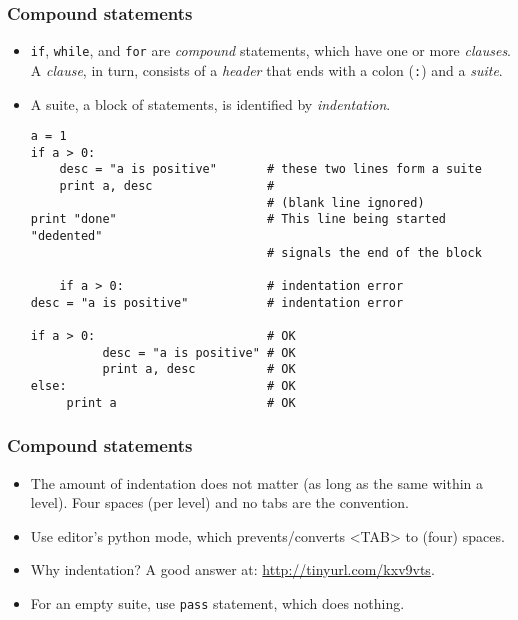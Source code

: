 \documentclass{beamer}
\begin{document}
\begin{frame}[fragile]
\frametitle{Compound statements}
\begin{itemize}
\item \lstinline{if}, \lstinline{while}, and \lstinline{for}
      are \emph{compound} statements, which have
      one or more \emph{clauses}. A \emph{clause}, in turn,
      consists of a \emph{header}
      that ends with a colon (\lstinline{:}) and 
      a \emph{suite}.
\item A suite, a block of statements, is identified by \emph{indentation}.
\begin{lstlisting}
a = 1
if a > 0:
    desc = "a is positive"       # these two lines form a suite 
    print a, desc                #
                                 # (blank line ignored)
print "done"                     # This line being started "dedented"
                                 # signals the end of the block

    if a > 0:                    # indentation error
desc = "a is positive"           # indentation error

if a > 0:                        # OK
          desc = "a is positive" # OK
          print a, desc          # OK
else:                            # OK 
     print a                     # OK
\end{lstlisting}
\end{itemize}
\end{frame}

\begin{frame}[fragile]
\frametitle{Compound statements}
\begin{itemize}
\item The amount of indentation does not matter (as long
      as the same within a level). Four
      spaces (per level) and no tabs are the convention.
\item Use editor's python mode, which prevents/converts
      <TAB> to (four) spaces.
\item Why indentation? A good answer at:
      \url{http://tinyurl.com/kxv9vts}.
\item For an empty suite, use \lstinline{pass} statement,
      which does nothing.
\end{itemize}
\end{frame}
\end{document}
